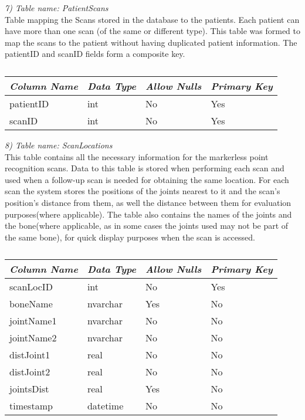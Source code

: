 \emph{7) Table name: PatientScans}\\

Table mapping the Scans stored in the database to the patients. Each patient can have more than one scan (of the same or different type). This table was formed to map the scans to the patient without having duplicated patient information. The patientID and scanID fields form a composite key.\\

\begin{table}[ht]
\centering
\begin{tabular}{| l | l | l | l |}
\hline
\emph{\bf{Column Name}} & \emph{\bf{Data Type}} & \emph{\bf{Allow Nulls}} & \emph{\bf{Primary Key}} \\\hline \hline
patientID & int & No & Yes \\\hline
scanID & int & No & Yes \\\hline
\end{tabular}
\label{table:patientScans}
\caption[Database: PatientScans]{}
\end{table}

\emph{8) Table name: ScanLocations}\\

This table contains all the necessary information for the markerless point recognition scans. Data to this table is stored when performing each scan and used when a follow-up scan is needed for obtaining the same location. For each scan the system stores the positions of the joints nearest to it and the scan's position's distance from them, as well the distance between them for evaluation purposes(where applicable).  The table also contains the names of the joints and the bone(where applicable, as in some cases the joints used may not be part of the same bone), for quick display purposes when the scan is accessed.\\

\begin{table}[ht]
\centering
\begin{tabular}{| l | l | l | l |}
\hline
\emph{\bf{Column Name}} & \emph{\bf{Data Type}} & \emph{\bf{Allow Nulls}} & \emph{\bf{Primary Key}} \\\hline \hline
scanLocID & int & No & Yes \\\hline
boneName & nvarchar & Yes & No \\\hline
jointName1 & nvarchar & No & No \\\hline
jointName2 & nvarchar & No & No \\\hline
distJoint1 & real & No & No \\\hline
distJoint2 & real & No & No \\\hline
jointsDist & real & Yes & No \\\hline
timestamp & datetime & No & No \\\hline
\end{tabular}
\label{table:scanLocations}
\caption[Database: ScanLocations]{}
\end{table}

